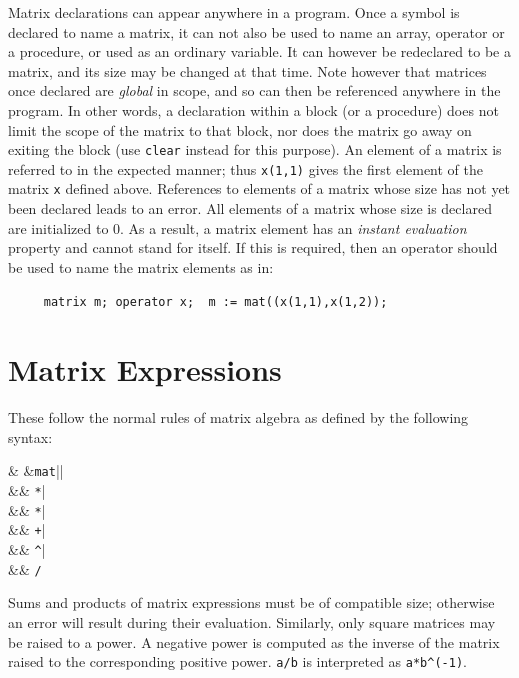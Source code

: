 Matrix declarations can appear anywhere in a program. Once a symbol is
declared to name a matrix, it can not also be used to name an array,
operator or a procedure, or used as an ordinary variable. It can however
be redeclared to be a matrix, and its size may be changed at that time.
Note however that matrices once declared are \emph{global} in scope, and so
can then be referenced anywhere in the program.  In other words, a
declaration within a block (or a procedure) does not limit the scope of
the matrix to that block, nor does the matrix go away on exiting the block
(use \texttt{clear} instead for this purpose).  An element of a matrix is
referred to in the expected manner; thus \texttt{x(1,1)} gives the first
element of the matrix \texttt{x} defined above.  References to elements of a
matrix whose size has not yet been declared leads to an error.  All
elements of a matrix whose size is declared are initialized to 0.  As a
result, a matrix element has an \emph{instant evaluation} property and cannot stand for itself.  If this is required,
then an operator should be used to name the matrix elements as in:
\begin{verbatim}
     matrix m; operator x;  m := mat((x(1,1),x(1,2));
\end{verbatim}

\section{Matrix Expressions}
\label{sec:core-matrix-expressions}

These follow the normal rules of matrix algebra as defined by the
following syntax:
\begin{syntaxtable}
     & \BNFprod &\texttt{mat}|| \\
      &&       \texttt{*}| \\
      &&       \texttt{*}| \\
      &&       \texttt{+}| \\
      &&       \texttt{\textasciicircum}| \\
      &&       \texttt{/}
\end{syntaxtable}
Sums and products of matrix expressions must be of compatible size;
otherwise an error will result during their evaluation.  Similarly, only
square matrices may be raised to a power.  A negative power is computed as
the inverse of the matrix raised to the corresponding positive power.
\texttt{a/b} is interpreted as \texttt{a*b\textasciicircum (-1)}.

